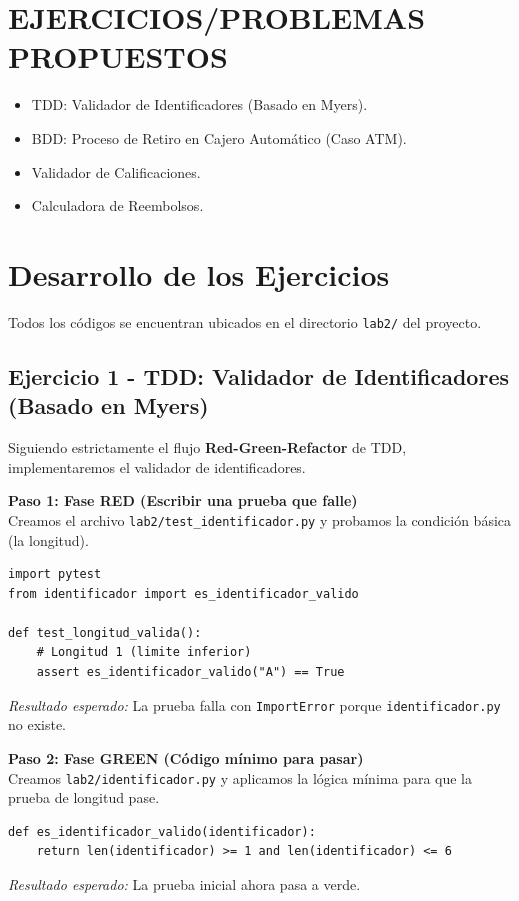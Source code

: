 \documentclass{article}
\begin{document}
\vspace*{10px}

\section{EJERCICIOS/PROBLEMAS PROPUESTOS}
\begin{itemize}		
    \item TDD: Validador de Identificadores (Basado en Myers).
    \item BDD: Proceso de Retiro en Cajero Automático (Caso ATM).
    \item Validador de Calificaciones.
    \item Calculadora de Reembolsos.
\end{itemize}

\section{Desarrollo de los Ejercicios}
Todos los códigos se encuentran ubicados en el directorio \texttt{lab2/} del proyecto.

\subsection{Ejercicio 1 - TDD: Validador de Identificadores (Basado en Myers)}

Siguiendo estrictamente el flujo \textbf{Red-Green-Refactor} de TDD, implementaremos el validador de identificadores.

\textbf{Paso 1: Fase RED (Escribir una prueba que falle)} \\
Creamos el archivo \texttt{lab2/test\_identificador.py} y probamos la condición básica (la longitud).

\begin{lstlisting}[caption={lab2/test\_identificador.py (Fase RED)}]
import pytest
from identificador import es_identificador_valido

def test_longitud_valida():
    # Longitud 1 (limite inferior)
    assert es_identificador_valido("A") == True
\end{lstlisting}
\textit{Resultado esperado:} La prueba falla con \texttt{ImportError} porque \texttt{identificador.py} no existe.

\textbf{Paso 2: Fase GREEN (Código mínimo para pasar)} \\
Creamos \texttt{lab2/identificador.py} y aplicamos la lógica mínima para que la prueba de longitud pase.
\begin{lstlisting}[caption={lab2/identificador.py (Fase GREEN)}]
def es_identificador_valido(identificador):
    return len(identificador) >= 1 and len(identificador) <= 6
\end{lstlisting}
\textit{Resultado esperado:} La prueba inicial ahora pasa a verde.
\end{document}
